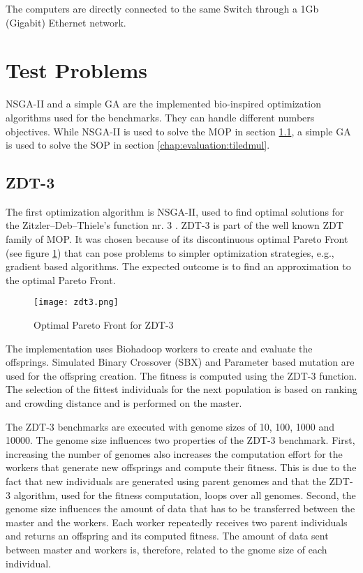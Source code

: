 The computers are directly connected to the same Switch through a 1Gb (Gigabit) Ethernet network.

\section{Test Problems}
\label{chap:evaluation:testproblems}
NSGA-II and a simple GA are the implemented bio-inspired optimization algorithms used for the benchmarks. They can handle different numbers objectives. While NSGA-II is used to solve the MOP in section \ref{chap:evaluation:zdt3}, a simple GA is used to solve the SOP in section \ref{chap:evaluation:tiledmul}.

\subsection{ZDT-3}
\label{chap:evaluation:zdt3}
The first optimization algorithm is NSGA-II, used to find optimal solutions for the Zitzler–Deb–Thiele's function nr. 3 \cite{zitzler2000comparison}. ZDT-3 is part of the well known ZDT family of MOP. It was chosen because of its discontinuous optimal Pareto Front (see figure \ref{fig:zdt3}) that can pose problems to simpler optimization strategies, e.g., gradient based algorithms. The expected outcome is to find an approximation to the optimal Pareto Front.

\begin{figure}
  \centering
  \texttt{[image: zdt3.png]}
  \caption[Optimal Pareto Front for ZDT-3]{Optimal Pareto Front for ZDT-3}
  \label{fig:zdt3}
\end{figure}

The implementation uses Biohadoop workers to create and evaluate the offsprings. Simulated Binary Crossover (SBX) and Parameter based mutation \cite{deb2000efficient} are used for the offspring creation. The fitness is computed using the ZDT-3 function. The selection of the fittest individuals for the next population is based on ranking and crowding distance and is performed on the master.

The ZDT-3 benchmarks are executed with genome sizes of 10, 100, 1000 and 10000. The genome size influences two properties of the ZDT-3 benchmark. First, increasing the number of genomes also increases the computation effort for the workers that generate new offsprings and compute their fitness. This is due to the fact that new individuals are generated using parent genomes and that the ZDT-3 algorithm, used for the fitness computation, loops over all genomes. Second, the genome size influences the amount of data that has to be transferred between the master and the workers. Each worker repeatedly receives two parent individuals and returns an offspring and its computed fitness. The amount of data sent between master and workers is, therefore, related to the gnome size of each individual.

